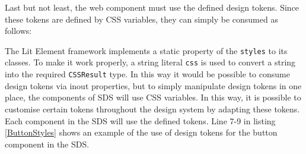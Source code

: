 Last but not least, the web component must use the defined design tokens. Since these tokens are defined by CSS variables, they can simply be consumed as follows: 

The Lit Element framework implements a static property of the \texttt{styles} to its classes. To make it work properly, a string literal \texttt{css} is used to convert a string into the required \texttt{CSSResult} type. In this way it would be possible to consume design tokens via inout properties, but to simply manipulate design tokens in one place, the components of SDS will use CSS variables. In this way, it is possible to customise certain tokens throughout the design system by adapting these tokens. Each component in the SDS will use the defined tokens. Line 7-9 in listing \ref{ButtonStyles} shows an example of the use of design tokens for the button component in the SDS. \\
